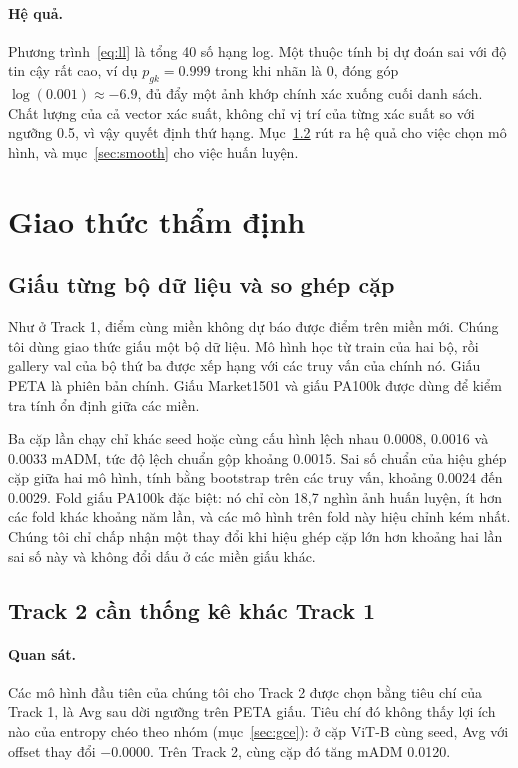 \documentclass[11pt,a4paper]{article}
\begin{document}
\paragraph{Hệ quả.} Phương trình~\eqref{eq:ll} là tổng 40 số hạng log. Một thuộc tính bị dự đoán sai với độ tin cậy rất cao, ví dụ $p_{gk}=0.999$ trong khi nhãn là 0, đóng góp $\log(0.001)\approx-6.9$, đủ đẩy một ảnh khớp chính xác xuống cuối danh sách. Chất lượng của cả vector xác suất, không chỉ vị trí của từng xác suất so với ngưỡng 0.5, vì vậy quyết định thứ hạng. Mục~\ref{sec:nll} rút ra hệ quả cho việc chọn mô hình, và mục~\ref{sec:smooth} cho việc huấn luyện.


\section{Giao thức thẩm định}
\label{sec:proxy}

\subsection{Giấu từng bộ dữ liệu và so ghép cặp}

Như ở Track 1, điểm cùng miền không dự báo được điểm trên miền mới. Chúng tôi dùng giao thức giấu một bộ dữ liệu. Mô hình học từ train của hai bộ, rồi gallery val của bộ thứ ba được xếp hạng với các truy vấn của chính nó. Giấu PETA là phiên bản chính. Giấu Market1501 và giấu PA100k được dùng để kiểm tra tính ổn định giữa các miền.

Ba cặp lần chạy chỉ khác seed hoặc cùng cấu hình lệch nhau 0.0008, 0.0016 và 0.0033 mADM, tức độ lệch chuẩn gộp khoảng 0.0015. Sai số chuẩn của hiệu ghép cặp giữa hai mô hình, tính bằng bootstrap trên các truy vấn, khoảng 0.0024 đến 0.0029. Fold giấu PA100k đặc biệt: nó chỉ còn 18,7 nghìn ảnh huấn luyện, ít hơn các fold khác khoảng năm lần, và các mô hình trên fold này hiệu chỉnh kém nhất. Chúng tôi chỉ chấp nhận một thay đổi khi hiệu ghép cặp lớn hơn khoảng hai lần sai số này và không đổi dấu ở các miền giấu khác.

\subsection{Track 2 cần thống kê khác Track 1}
\label{sec:nll}

\paragraph{Quan sát.} Các mô hình đầu tiên của chúng tôi cho Track 2 được chọn bằng tiêu chí của Track 1, là Avg sau dời ngưỡng trên PETA giấu. Tiêu chí đó không thấy lợi ích nào của entropy chéo theo nhóm (mục~\ref{sec:gce}): ở cặp ViT-B cùng seed, Avg với offset thay đổi $-0.0000$. Trên Track 2, cùng cặp đó tăng mADM 0.0120.
\end{document}
